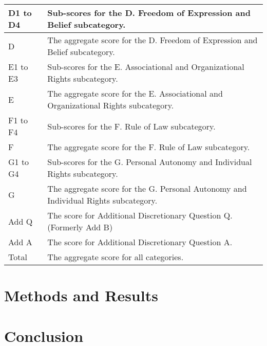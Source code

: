 \documentclass{article}
\theoremstyle{plain}
\theoremstyle{definition}
\theoremstyle{remark}
\begin{document}
\begin{table}[H]
\begin{center}
\begin{small}
\begin{tabular}{|p{}|p{}|}
D1 to D4 & Sub-scores for the D. Freedom of Expression and Belief subcategory. \\
\hline

D & The aggregate score for the D. Freedom of Expression and Belief subcategory. \\
\hline

E1 to E3 & Sub-scores for the E. Associational and Organizational Rights subcategory. \\
\hline

E & The aggregate score for the E. Associational and Organizational Rights subcategory. \\
\hline

F1 to F4 & Sub-scores for the F. Rule of Law subcategory. \\
\hline

F & The aggregate score for the F. Rule of Law subcategory. \\
\hline

G1 to G4 & Sub-scores for the G. Personal Autonomy and Individual Rights subcategory. \\
\hline

G & The aggregate score for the G. Personal Autonomy and Individual Rights subcategory. \\
\hline

Add Q & The score for Additional Discretionary Question Q. (Formerly Add B) \\
\hline

Add A & The score for Additional Discretionary Question A. \\
\hline

Total & The aggregate score for all categories. \\
\hline

\end{tabular}

\end{small}

\end{center}

\vskip -0.1in

\end{table}


\section{Methods and Results}
\label{methods}


\section{Conclusion}
\label{conclusion}
\end{document}
